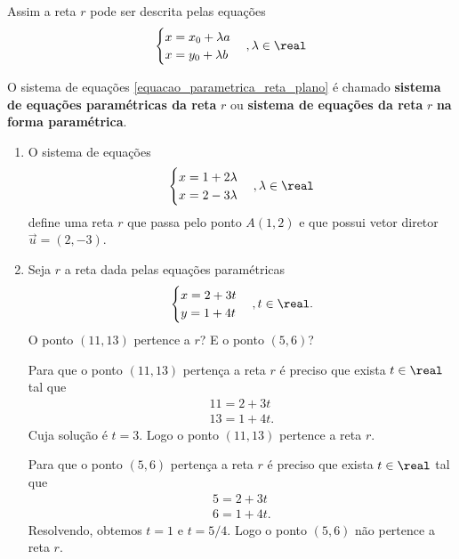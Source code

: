 Assim a reta $r$ pode ser descrita pelas equações
\begin{equation}\label{equacao_parametrica_reta_plano}
  \begin{cases}
    x = x_0 + \lambda a\\
    x = y_0 + \lambda b
  \end{cases}, \lambda \in \real
\end{equation}

\begin{definicao}
  O sistema de equações \eqref{equacao_parametrica_reta_plano} é chamado \textbf{sistema de equações paramétricas da reta} $r$ ou \textbf{sistema de equações da reta} $r$ \textbf{na forma paramétrica}.
\end{definicao}

\begin{exemplos}
  \begin{enumerate}
    \item O sistema de equações
    \[
      \begin{cases}
        x = 1 + 2\lambda\\
        x = 2 - 3\lambda
      \end{cases}, \lambda \in \real
    \]
    define uma reta $r$ que passa pelo ponto $A(1,2)$ e que possui vetor diretor $\vec{u} = (2, -3)$.
    \item Seja $r$ a reta dada pelas equações paramétricas
    \[
      \begin{cases}
        x = 2 + 3t\\
        y = 1 + 4t
      \end{cases}, t\in \real.
    \]
    O ponto $(11, 13)$ pertence a $r$? E o ponto $(5,6)$?
    \begin{solucao}
      Para que o ponto $(11,13)$ pertença a reta $r$ é preciso que exista $t \in \real$ tal que
      \begin{align*}
        11 = 2 + 3t\\
        13 = 1 + 4t.
      \end{align*}
    Cuja solução é $t = 3$. Logo o ponto $(11,13)$ pertence a reta $r$.

    Para que o ponto $(5,6)$ pertença a reta $r$ é preciso que exista $t \in \real$ tal que
      \begin{align*}
        5 = 2 + 3t\\
        6 = 1 + 4t.
      \end{align*}
    Resolvendo, obtemos $t = 1$ e $t = 5/4$. Logo o ponto $(5,6)$ não pertence a reta $r$.
    \end{solucao}
  \end{enumerate}
\end{exemplos}

